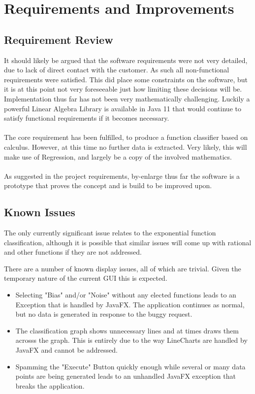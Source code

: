 \documentclass[main.tex]{subfiles}
\begin{document}
  
  \section{Requirements and Improvements}
    
    \subsection{Requirement Review}
      
      It should likely be argued that the software requirements were not very detailed, due to lack of direct contact with the customer. As such all non-functional requirements were satisfied. This did place some constraints on the software, but it is at this point not very foreseeable just how limiting these decisions will be. Implementation thus far has not been very mathematically challenging. Luckily a powerful Linear Algebra Library is available in Java 11 \cite{} that would continue to satisfy functional requirements if it becomes necessary.
      \\\\
      The core requirement has been fulfilled, to produce a function classifier based on calculus. However, at this time no further data is extracted. Very likely, this will make use of Regression, and largely be a copy of the involved mathematics.
      \\\\
      As suggested in the project requirements, by-enlarge thus far the software is a prototype that proves the concept and is build to be improved upon.
      
    \subsection{Known Issues}
      
      The only currently significant issue relates to the exponential function classification, although it is possible that similar issues will come up with rational and other functions if they are not addressed.
      
      
      
      There are a number of known display issues, all of which are trivial. Given the temporary nature of the current GUI this is expected.
      \begin{itemize}
        \item Selecting "Bias" and/or "Noise" without any elected functions leads to an Exception that is handled by JavaFX. The application continues as normal, but no data is generated in response to the buggy request.
        \item The classification graph shows unnecessary lines and at times draws them acrosss the graph. This is entirely due to the way LineCharts are handled by JavaFX and cannot be addressed.
        \item Spamming the "Execute" Button quickly enough while several or many data points are being generated leads to an unhandled JavaFX exception that breaks the application.
      \end{itemize}
      
\end{document}
